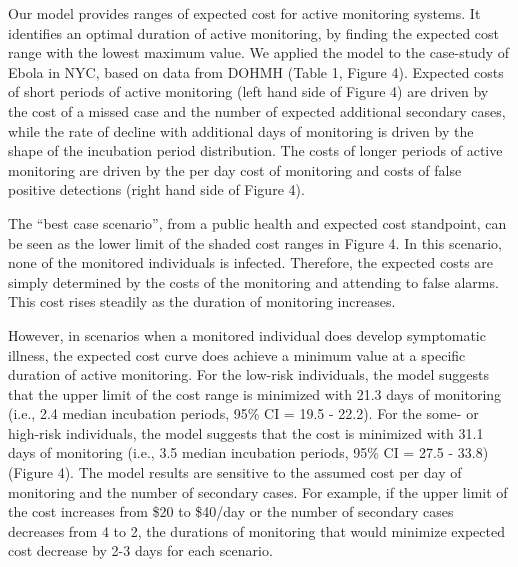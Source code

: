 \documentclass[]{article}
\begin{document}
Our model provides ranges of expected cost for active monitoring
systems. It identifies an optimal duration of active monitoring, by
finding the expected cost range with the lowest maximum value. We
applied the model to the case-study of Ebola in NYC, based on data from
DOHMH (Table 1, Figure 4). Expected costs of short periods of active
monitoring (left hand side of Figure 4) are driven by the cost of a
missed case and the number of expected additional secondary cases, while
the rate of decline with additional days of monitoring is driven by the
shape of the incubation period distribution. The costs of longer periods
of active monitoring are driven by the per day cost of monitoring and
costs of false positive detections (right hand side of Figure 4).

The ``best case scenario'', from a public health and expected cost
standpoint, can be seen as the lower limit of the shaded cost ranges in
Figure 4. In this scenario, none of the monitored individuals is
infected. Therefore, the expected costs are simply determined by the
costs of the monitoring and attending to false alarms. This cost rises
steadily as the duration of monitoring increases.

However, in scenarios when a monitored individual does develop
symptomatic illness, the expected cost curve does achieve a minimum
value at a specific duration of active monitoring. For the low-risk
individuals, the model suggests that the upper limit of the cost range
is minimized with 21.3 days of monitoring (i.e., 2.4 median incubation
periods, 95\% CI = 19.5 - 22.2). For the some- or high-risk individuals,
the model suggests that the cost is minimized with 31.1 days of
monitoring (i.e., 3.5 median incubation periods, 95\% CI = 27.5 - 33.8)
(Figure 4). The model results are sensitive to the assumed cost per day
of monitoring and the number of secondary cases. For example, if the
upper limit of the cost increases from \$20 to \$40/day or the number of
secondary cases decreases from 4 to 2, the durations of monitoring that
would minimize expected cost decrease by 2-3 days for each scenario.
\end{document}
